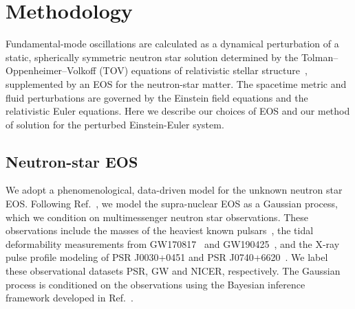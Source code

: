 \documentclass[aps,prd,twocolumn,superscriptaddress,footinbib]{revtex4-1}
\begin{document}

\section{Methodology} \label{sec:fmode}

Fundamental-mode oscillations are calculated as a dynamical perturbation of a static, spherically symmetric neutron star solution determined by the Tolman–Oppenheimer–Volkoff (TOV) equations of relativistic stellar structure~\cite{Tolman1939,OppenheimerVolkoff1939}, supplemented by an EOS for the neutron-star matter. The spacetime metric and fluid perturbations are governed by the Einstein field equations and the relativistic Euler equations. Here we describe our choices of EOS and our method of solution for the perturbed Einstein-Euler system.

\subsection{Neutron-star EOS}

We adopt a phenomenological, data-driven model for the unknown neutron star EOS. Following Ref.~\cite{LegredChatziioannou2021}, we model the supra-nuclear EOS as a Gaussian process, which we condition on multimessenger neutron star observations. These observations include the masses of the heaviest known pulsars~\cite{AntoniadisFreire2013,FonsecaCromartie2021}, the tidal deformability measurements from GW170817~\cite{GW170817} and GW190425~\cite{GW190425}, and the X-ray pulse profile modeling of PSR J0030+0451 and PSR J0740+6620~\cite{MillerLamb2019,MillerLamb2021}. We label these observational datasets PSR, GW and NICER, respectively. The Gaussian process is conditioned on the observations using the Bayesian inference framework developed in Ref.~\cite{LandryEssick2020}.
\end{document}
